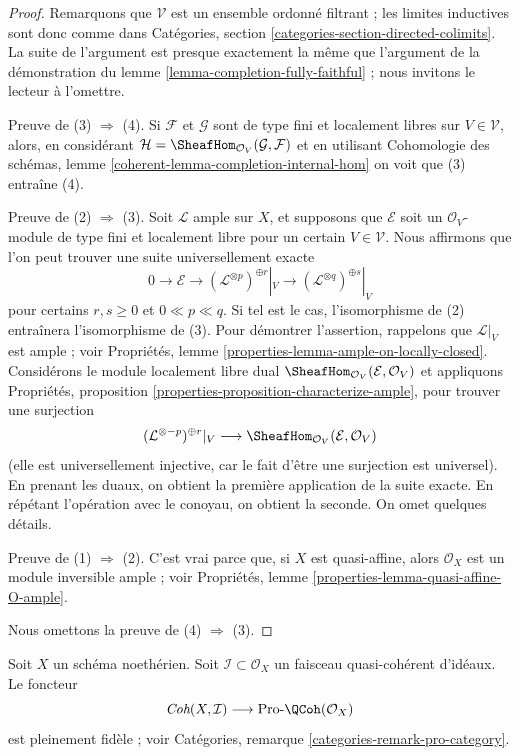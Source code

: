 \begin{proof}
Remarquons que $\mathcal{V}$ est un ensemble ordonné filtrant ; les limites inductives sont donc
comme dans Catégories, section \ref{categories-section-directed-colimits}.
La suite de l'argument est presque exactement la même que l'argument
de la démonstration du lemme \ref{lemma-completion-fully-faithful} ; nous invitons
le lecteur à l'omettre.

\medskip\noindent
Preuve de (3) $\Rightarrow$ (4). Si $\mathcal{F}$ et $\mathcal{G}$
sont de type fini et localement libres sur $V \in \mathcal{V}$, alors, en considérant
$\mathcal{H} = \SheafHom_{\mathcal{O}_V}(\mathcal{G}, \mathcal{F})$
et en utilisant Cohomologie des schémas, lemme
\ref{coherent-lemma-completion-internal-hom}
on voit que (3) entraîne (4).

\medskip\noindent
Preuve de (2) $\Rightarrow$ (3). Soit $\mathcal{L}$ ample
sur $X$, et supposons que $\mathcal{E}$ soit un
$\mathcal{O}_V$-module de type fini et localement libre
pour un certain $V \in \mathcal{V}$.
Nous affirmons que l'on peut trouver une suite universellement exacte
$$
0 \to \mathcal{E} \to
(\mathcal{L}^{\otimes p})^{\oplus r}|_{V} \to
(\mathcal{L}^{\otimes q})^{\oplus s}|_{V}
$$
pour certains $r, s \geq 0$ et $0 \ll p \ll q$. Si tel est le cas,
l'isomorphisme de (2) entraînera l'isomorphisme de (3).
Pour démontrer l'assertion, rappelons que $\mathcal{L}|_V$ est ample ; voir
Propriétés, lemme \ref{properties-lemma-ample-on-locally-closed}.
Considérons le module localement libre dual
$\SheafHom_{\mathcal{O}_V}(\mathcal{E}, \mathcal{O}_V)$
et appliquons
Propriétés, proposition \ref{properties-proposition-characterize-ample},
pour trouver une surjection
$$
(\mathcal{L}^{\otimes -p})^{\oplus r}|_V \longrightarrow
\SheafHom_{\mathcal{O}_V}(\mathcal{E}, \mathcal{O}_V)
$$
(elle est universellement injective, car le fait d'être une surjection est universel).
En prenant les duaux, on obtient la première application de la suite exacte.
En répétant l'opération avec le conoyau, on obtient la seconde. On omet quelques détails.

\medskip\noindent
Preuve de (1) $\Rightarrow$ (2). C'est vrai parce que, si $X$ est quasi-affine,
alors $\mathcal{O}_X$ est un module inversible ample ; voir
Propriétés, lemme \ref{properties-lemma-quasi-affine-O-ample}.

\medskip\noindent
Nous omettons la preuve de (4) $\Rightarrow$ (3).
\end{proof}

\begin{lemma}
\label{lemma-recognize-formal-coherent-modules}
Soit $X$ un schéma noethérien. Soit $\mathcal{I} \subset \mathcal{O}_X$
un faisceau quasi-cohérent d'idéaux. Le foncteur
$$
\textit{Coh}(X, \mathcal{I}) \longrightarrow \text{Pro-}\QCoh(\mathcal{O}_X)
$$
est pleinement fidèle ; voir Catégories, remarque \ref{categories-remark-pro-category}.
\end{lemma}

